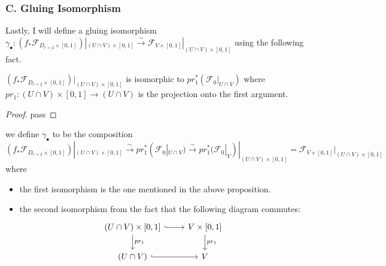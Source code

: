 \subsubsection{C. Gluing Isomorphism}
Lastly, I will define a gluing isomorphism $\gamma_\bullet : (f_*\mathscr{F}_{D_{r=2}\times [0,1]})|_{(U\cap V)\times [0,1]} \xrightarrow{\sim} \mathscr{F}_{V\times [0,1]}|_{(U\cap V)\times [0,1]}$ using the following fact.
\begin{proposition}
$(f_*\mathscr{F}_{D_{r=2}\times [0,1]})|_{(U\cap V)\times[0,1]}$ is isomorphic to $pr_1^*(\mathscr{F}_0|_{U\cap V})$ where $pr_1 : (U\cap V) \times [0,1] \rightarrow (U\cap V)$ is the projection onto the first argument.
\end{proposition}
\begin{proof}
pass
\end{proof}
\begin{definition}
we define $\gamma_\bullet$ to be the composition 
\[
(f_*\mathscr{F}_{D_{r=2}\times [0,1]})|_{(U\cap V)\times [0,1]}\xrightarrow{\sim}pr_1^*(\mathscr{F}_0|_{U\cap V})\xrightarrow{\sim}pr_1^*(\mathscr{F}_0|_{V})|_{(U\cap V)\times [0,1]}=\mathscr{F}_{V\times [0,1]}|_{(U\cap V)\times [0,1]}
\]
where
\begin{itemize}
\item the first isomorphism is the one mentioned in the above proposition.

\item the second isomorphism from the fact that the following diagram commutes:
\[
\begin{tikzcd}
(U\cap V)\times [0,1] \arrow[hookrightarrow]{r}\arrow[d, "pr_1"]     & V\times [0,1] \arrow[d, "pr_1"] \\
(U\cap V) \arrow[hookrightarrow]{r} & V 
\end{tikzcd}
\]
\end{itemize}
\end{definition}

